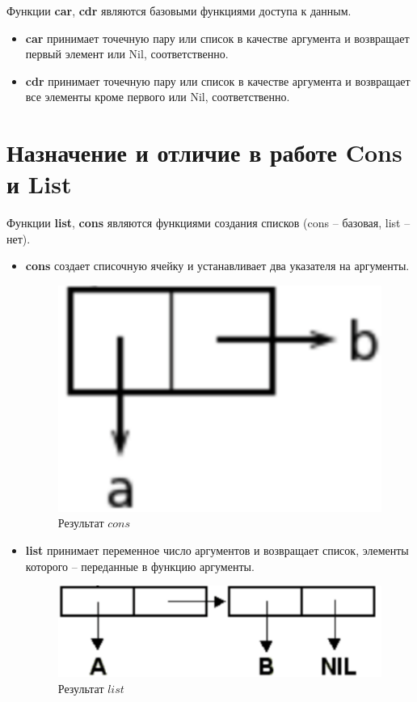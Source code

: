 \documentclass[a4paper,14pt, unknownkeysallowed]{extreport}
\begin{document}
Функции \textbf{car}, \textbf{cdr} являются базовыми функциями доступа к данным. 

\begin{itemize}
	\item \textbf{car} принимает точечную пару или список в качестве аргумента и возвращает первый элемент или Nil, соответственно. 
	\item \textbf{cdr} принимает точечную пару или список в качестве аргумента и возвращает все элементы кроме первого или Nil, соответственно.
\end{itemize}

\section{Назначение и отличие в работе Cons и List}

Функции \textbf{list}, \textbf{cons} являются функциями создания списков (cons – базовая, list – нет). 

\begin{itemize}
	\item \textbf{cons} создает списочную ячейку и устанавливает два указателя на аргументы.
	
	\begin{figure}[h]
		\centering
		\includegraphics[scale=0.4]{img/picture1.png}
		\caption{Результат $cons$}
		\label{fig:picture1}
	\end{figure} 
	
	\item \textbf{list} принимает переменное число аргументов и возвращает список, элементы которого -- переданные в функцию аргументы.
	
	\begin{figure}[h]
		\centering
		\includegraphics[scale=0.45]{img/picture2.png}
		\caption{Результат $list$}
		\label{fig:picture2}
	\end{figure} 

\end{itemize} 
\end{document}
